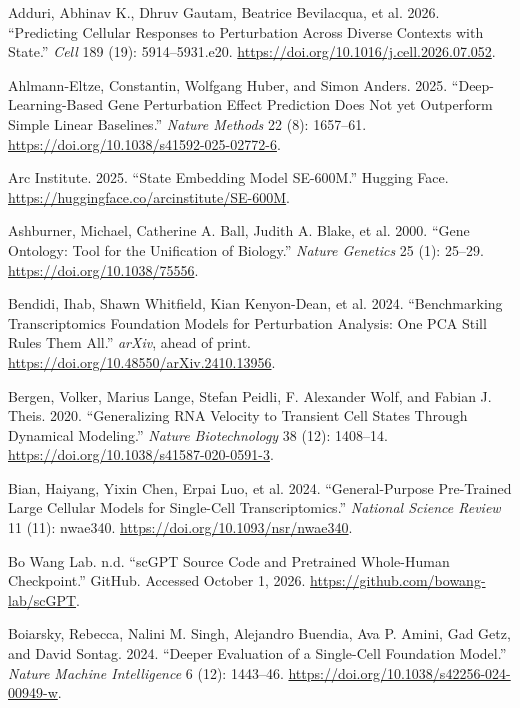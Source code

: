 \documentclass[
  11pt,
]{article}
\newlength{\cslhangindent}
\newenvironment{CSLReferences}[2] %
 {\begin{list}{}{%
  \setlength{\itemindent}{0pt}
  \setlength{\leftmargin}{0pt}
  \setlength{\parsep}{0pt}
  \ifodd #1
   \setlength{\leftmargin}{\cslhangindent}
   \setlength{\itemindent}{-1\cslhangindent}
  \fi
  \setlength{\itemsep}{#2\baselineskip}}}
 {\end{list}}
\begin{document}
\protect{}\label{refs}
\begin{CSLReferences}{1}{1}
{Adduri, Abhinav K., Dhruv Gautam, Beatrice Bevilacqua, et al.} 2026.
{``Predicting Cellular Responses to Perturbation Across Diverse Contexts
with {State}.''} \emph{Cell} 189 (19): 5914--5931.e20.
\url{https://doi.org/10.1016/j.cell.2026.07.052}.

Ahlmann-Eltze, Constantin, Wolfgang Huber, and Simon Anders. 2025.
{``Deep-Learning-Based Gene Perturbation Effect Prediction Does Not yet
Outperform Simple Linear Baselines.''} \emph{Nature Methods} 22 (8):
1657--61. \url{https://doi.org/10.1038/s41592-025-02772-6}.

Arc Institute. 2025. {``{State Embedding} Model {SE-600M}.''} Hugging
Face. \url{https://huggingface.co/arcinstitute/SE-600M}.

{Ashburner, Michael, Catherine A. Ball, Judith A. Blake, et al.} 2000.
{``Gene {Ontology}: Tool for the Unification of Biology.''} \emph{Nature
Genetics} 25 (1): 25--29. \url{https://doi.org/10.1038/75556}.

Bendidi, Ihab, Shawn Whitfield, Kian Kenyon-Dean, et al. 2024.
{``Benchmarking Transcriptomics Foundation Models for Perturbation
Analysis: One {PCA} Still Rules Them All.''} \emph{arXiv}, ahead of
print. \url{https://doi.org/10.48550/arXiv.2410.13956}.

Bergen, Volker, Marius Lange, Stefan Peidli, F. Alexander Wolf, and
Fabian J. Theis. 2020. {``Generalizing {RNA} Velocity to Transient Cell
States Through Dynamical Modeling.''} \emph{Nature Biotechnology} 38
(12): 1408--14. \url{https://doi.org/10.1038/s41587-020-0591-3}.

Bian, Haiyang, Yixin Chen, Erpai Luo, et al. 2024. {``General-Purpose
Pre-Trained Large Cellular Models for Single-Cell Transcriptomics.''}
\emph{National Science Review} 11 (11): nwae340.
\url{https://doi.org/10.1093/nsr/nwae340}.

Bo Wang Lab. n.d. {``{scGPT} Source Code and Pretrained Whole-Human
Checkpoint.''} GitHub. Accessed October 1, 2026.
\url{https://github.com/bowang-lab/scGPT}.

Boiarsky, Rebecca, Nalini M. Singh, Alejandro Buendia, Ava P. Amini, Gad
Getz, and David Sontag. 2024. {``Deeper Evaluation of a Single-Cell
Foundation Model.''} \emph{Nature Machine Intelligence} 6 (12):
1443--46. \url{https://doi.org/10.1038/s42256-024-00949-w}.


\end{CSLReferences}
\end{document}
